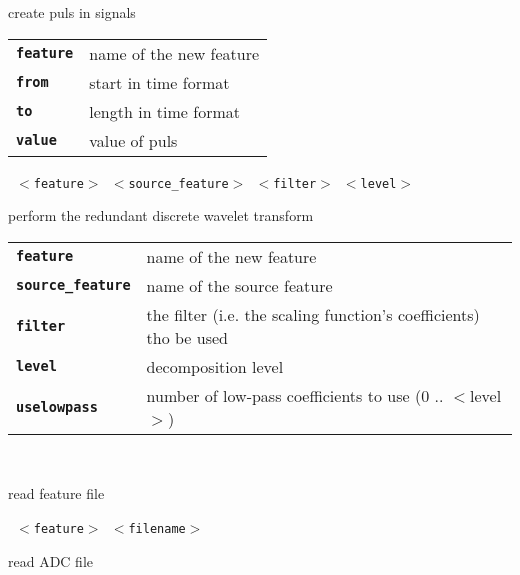 \begin{description}
\begin{description}
        create puls in signals

      \begin{tabular}{ll}
 \texttt{\textbf{feature}} &  name of the new feature \\
 \texttt{\textbf{from}} &     start in time format  \\
 \texttt{\textbf{to}} &       length in time format  \\
 \texttt{\textbf{value}} &     value of puls  \\
      \end{tabular}
       \texttt{ $<$feature$>$ $<$source\_feature$>$ $<$filter$>$ $<$level$>$ } \

        perform the redundant discrete wavelet transform

      \begin{tabular}{ll}
 \texttt{\textbf{feature}} &         name of the new feature \\
 \texttt{\textbf{source\_feature}} &  name of the source feature \\
 \texttt{\textbf{filter}} &          the filter (i.e. the scaling function's coefficients) tho be used \\
 \texttt{\textbf{level}} &           decomposition level  \\
 \texttt{\textbf{uselowpass}} &       number of low-pass coefficients to use (0 .. $<$level$>$)  \\
      \end{tabular}
       \texttt{} \

        read feature file

       \texttt{ $<$feature$>$ $<$filename$>$               } \

        read ADC file


\end{description}
\end{description}
